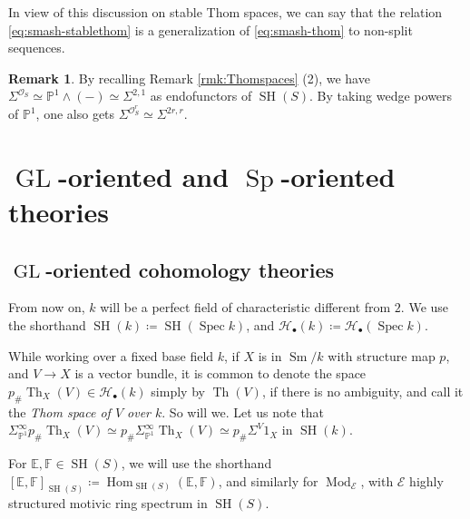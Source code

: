 \documentclass[10pt]{amsart}
\theoremstyle{definition}
\newtheorem{rmk}[defn]{Remark}
\theoremstyle{plain}
\numberwithin{equation}{section}
\newcommand{\0}{\emptyset}
\newcommand{\sE}{{\mathcal E}}
\newcommand{\sH}{{\mathcal H}}
\newcommand{\E}{{\mathbb E}}
\newcommand{\F}{{\mathbb F}}
\renewcommand{\P}{{\mathbb P}}
\newcommand{\GL}{{\operatorname{GL}}}
\newcommand{\Sp}{{\operatorname{Sp}}}
\newcommand{\Spec}{{\operatorname{Spec}}}
\newcommand{\SH}{{\operatorname{SH}}}
\newcommand{\Th}{{\operatorname{Th}}}
\newcommand{\Sm}{{\operatorname{Sm}}}
\newcommand{\Hom}{{\operatorname{Hom}}}
\newcommand{\Mod}{{\operatorname{Mod}}}
\begin{document}
In view of this discussion on stable Thom spaces, we can say that the relation \eqref{eq:smash-stablethom} is a generalization of \eqref{eq:smash-thom} to non-split sequences.

\begin{rmk}
By recalling Remark \ref{rmk:Thomspaces} (2), we have $\Sigma^{\mathcal{O}_S} \simeq \P^1 \wedge (-) \simeq \Sigma^{2,1}$ as endofunctors of $\SH(S)$. By taking wedge powers of $\P^1$, one also gets $\Sigma^{\mathcal{O}_S^r}\simeq \Sigma^{2r,r}$.
\end{rmk}

\section{$\GL$-oriented and $\Sp$-oriented theories}

\subsection{$\GL$-oriented cohomology theories}

From now on, $k$ will be a perfect field of characteristic different from $2$. We use the shorthand $\SH(k) \coloneqq \SH(\Spec k)$, and $\sH_\bullet (k) \coloneqq \sH_\bullet(\Spec k)$.

While working over a fixed base field $k$, if $X$ is in $\Sm/k$ with structure map $p$, and $V \to X$ is a vector bundle, it is common to denote the space $p_\# \Th_X(V) \in \sH_\bullet(k)$ simply by $\Th(V)$, if there is no ambiguity, and call it the \emph{Thom space of $V$ over $k$}. So will we. Let us note that $\Sigma_{\P^1}^\infty p_\# \Th_X(V) \simeq p_\# \Sigma_{\P^1}^\infty \Th_X(V) \simeq p_\#\Sigma^V 1_X$ in $\SH(k)$.

For $\E,\F \in \SH(S)$, we will use the shorthand $[\E,\F]_{\SH(S)} \coloneqq \Hom_{\SH(S)}(\E,\F)$, and similarly for $\Mod_\sE$, with $\sE$ highly structured motivic ring spectrum in $\SH(S)$.
\end{document}
